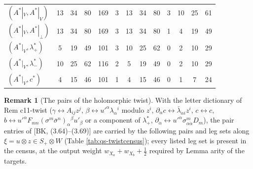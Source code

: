 \documentclass[11pt]{article}
\numberwithin{equation}{section}
\theoremstyle{plain}
\theoremstyle{definition}
\newtheorem{remark}[theorem]{Remark}
\begin{document}
\begin{longtable}{l|cccc|cccc|cccc}
$(A^*|_V,A^*|_V)$ & 13 & 34 & 80 & 169 & 3 & 13 & 34 & 80 & 3 & 10 & 25 & 61\\
$(A^*|_V,A^*|_\perp)$ & 13 & 34 & 80 & 169 & 3 & 13 & 34 & 80 & 1 & 4 & 19 & 49\\
$(A^*|_V,\lambda^*_+)$ & 5 & 19 & 49 & 101 & 3 & 10 & 25 & 62 & 0 & 2 & 10 & 29\\
$(A^*|_V,\lambda^*_-)$ & 10 & 25 & 62 & 116 & 2 & 5 & 19 & 49 & 0 & 2 & 10 & 29\\
$(A^*|_V,c^*)$ & 4 & 15 & 46 & 101 & 1 & 4 & 15 & 46 & 0 & 1 & 7 & 24\\
\end{longtable}



\begin{remark}[The pairs of the holomorphic twist]
\label{rem:qs-twistpairs}
With the letter dictionary of Rem c11-twist ($\gamma\leftrightarrow A_{ij}z^j$, $\beta\leftrightarrow u'^\alpha\lambda_\alpha{}^i$ modulo $z^i$, $\partial_{\dot\alpha}c\leftrightarrow\bar\lambda_{\dot\alpha i}z^i$, $c\leftrightarrow c$, $b\leftrightarrow u'^\alpha F_{mn}(\sigma^m\bar\sigma^n)_\alpha{}^\beta u'_\beta$ or a component of $\lambda^*_+$, $\partial_{\dot\alpha}\leftrightarrow u'^\alpha\sigma^m_{\alpha\dot\alpha}D_m$), the pair entries of [BK, (3.64)--(3.69)] are carried by the following pairs and leg sets along $\xi=u\otimes z\in S_+\otimes W$ (Table \ref{tab:qs-twistcensus}); every listed leg set is present in the census, at the output weight $w_{X_a}+w_{X_b}+\tfrac12$ required by Lemma arity of the targets.
\end{remark}
\end{document}

